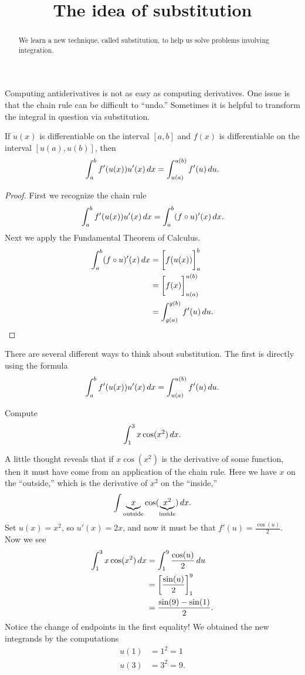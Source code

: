 \documentclass{ximera}
\title[Dig-In:]{The idea of substitution}
\begin{document}
\begin{abstract}
  We learn a new technique, called substitution, to help us solve
  problems involving integration.
\end{abstract}
\maketitle


Computing antiderivatives is not as easy as computing derivatives. 
One issue is that the chain rule can be difficult to ``undo.'' 
Sometimes  it is helpful to transform the integral in question via substitution. 


\begin{theorem} 
If $u(x)$ is differentiable on the interval $[a,b]$ and $f(x)$ is
differentiable on the interval $[u(a),u(b)]$, then
\[
\int_a^b f'(u(x)) u'(x) \,d x =\int_{u(a)}^{u(b)} f'(u) \,d u.
\]
\end{theorem}
\begin{proof} First we recognize the chain rule
\[
\int_a^b f'(u(x)) u'(x) \,d x = \int_a^b (f\circ u)'(x) \,d x.
\]
Next we apply the Fundamental Theorem of Calculus. 
\begin{align*} 
\int_a^b (f\circ u)'(x) \,d x &= \bigg[ f(u(x)) \bigg]_a^b \\
&= \bigg[ f(x) \bigg]_{u(a)}^{u(b)}\\ 
&= \int_{g(a)}^{g(b)} f'(u) \,d u.
\end{align*}
\end{proof}


There are several different ways to think about substitution. The
first is directly using the formula
\[
\int_a^b f'(u(x)) u'(x) \,d x = \int_{u(a)}^{u(b)} f'(u) \,d u.
\]
\begin{example}
Compute
\[
\int_1^3 x\cos(x^2)\,d x.
\]
\begin{explanation}
A little thought reveals that if $x\cos(x^2)$ is the derivative of
some function, then it must have come from an application of the chain
rule. Here we have $x$ on the ``outside,'' which is the derivative of
$x^2$ on the ``inside,'' 
\[
\int \underbrace{x}_{\text{outside}}\cos(\underbrace{x^2}_{\text{inside}})\,d x.
\]
Set $u(x) = x^2$, so $u'(x) = 2x$, and now it must be that $f'(u) =
\frac{\cos(u)}{2}$. Now we see
\begin{align*}
\int_1^3 x\cos(x^2)\,d x &= \int_1^9 \frac{\cos(u)}{2}\,d u\\
&= \bigg[ \frac{\sin(u)}{2} \bigg]_1^9 \\
&= \frac{\sin(9) -\sin(1)}{2}.
\end{align*}
Notice the change of endpoints in the first equality!  
We obtained the new integrands by the computations
\begin{align*}
u(1) &= 1^2 = 1  \\
u(3) &= 3^2 = 9.
\end{align*}
\end{explanation}
\end{example}
\end{document}
